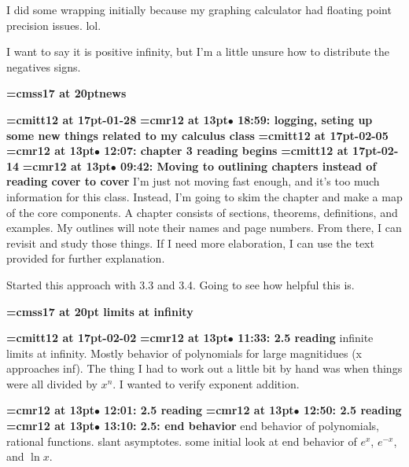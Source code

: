 I did some wrapping initially because my graphing calculator had floating point precision issues. lol.
\par

I want to say it is positive infinity, but I'm a little unsure how to distribute the negatives signs.
\par

{\medskip\noindent\bf\font\titlefont=cmss17 at 20pt\titlefont news}\medskip

{\medskip\noindent\bf\font\titlefont=cmitt12 at 17pt-01-28}\medskip
{\smallskip\noindent\bf\font\titlefont=cmr12 at 13pt\titlefont $\bullet$ 18:59: logging, seting up some new things related to my calculus class}\smallskip
{\medskip\noindent\bf\font\titlefont=cmitt12 at 17pt-02-05}\medskip
{\smallskip\noindent\bf\font\titlefont=cmr12 at 13pt\titlefont $\bullet$ 12:07: chapter 3 reading begins}\smallskip
{\medskip\noindent\bf\font\titlefont=cmitt12 at 17pt-02-14}\medskip
{\smallskip\noindent\bf\font\titlefont=cmr12 at 13pt\titlefont $\bullet$ 09:42: Moving to outlining chapters instead of reading cover to cover}\smallskip
I'm just not moving fast enough, and it's too much information for this class. Instead, I'm going to skim the chapter and make a map of the core components. A chapter consists of sections, theorems, definitions, and examples. My outlines will note their names and page numbers. From there, I can revisit and study those things. If I need more elaboration, I can use the text provided for further explanation.
\par

Started this approach with 3.3 and 3.4. Going to see how helpful this is.
\par

{\medskip\noindent\bf\font\titlefont=cmss17 at 20pt limits at infinity}\medskip

{\medskip\noindent\bf\font\titlefont=cmitt12 at 17pt-02-02}\medskip
{\smallskip\noindent\bf\font\titlefont=cmr12 at 13pt\titlefont $\bullet$ 11:33: 2.5 reading}\smallskip
infinite limits at infinity. Mostly behavior of polynomials for large magnitidues (x approaches inf). The thing I had to work out a little bit by hand was when things were all divided by $x^n$. I wanted to verify exponent addition.
\par

{\smallskip\noindent\bf\font\titlefont=cmr12 at 13pt\titlefont $\bullet$ 12:01: 2.5 reading}\smallskip
{\smallskip\noindent\bf\font\titlefont=cmr12 at 13pt\titlefont $\bullet$ 12:50: 2.5 reading}\smallskip
{\smallskip\noindent\bf\font\titlefont=cmr12 at 13pt\titlefont $\bullet$ 13:10: 2.5: end behavior}\smallskip
end behavior of polynomials, rational functions. slant asymptotes. some initial look at end behavior of $e^{x}$, $e^{-x}$, and $\ln x$.
\par

